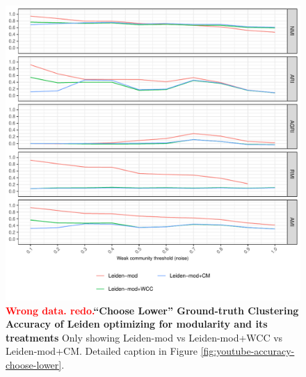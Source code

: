 \documentclass[aps,pre,superscriptaddress]{revtex4}
\begin{document}
\begin{figure}[!htpb]
\centering
\includegraphics[]{figures/choose_lower_youtube_leiden_mod_accuracy.pdf}
\caption[]{\textbf{\textcolor{red}{Wrong data. redo.}``Choose Lower'' Ground-truth Clustering Accuracy of Leiden optimizing for modularity and its treatments} Only showing Leiden-mod vs Leiden-mod+WCC vs Leiden-mod+CM. Detailed caption in Figure \ref{fig:youtube-accuracy-choose-lower}.}
\label{fig:choose-lower-leiden-mod}
\end{figure}
\end{document}
